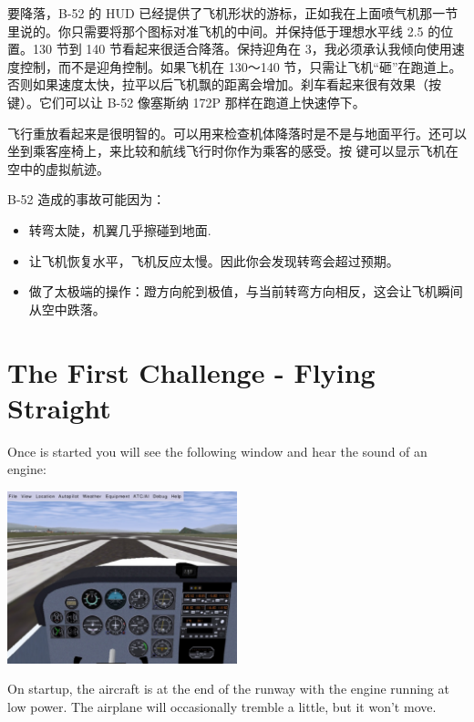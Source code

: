 \begin{itemize}
要降落，B-52 的 HUD 已经提供了飞机形状的游标，正如我在上面喷气机那一节里说的。你只需要将那个图标对准飞机的中间。并保持低于理想水平线 2.5\textdegree{} 的位置。130 节到 140 节看起来很适合降落。保持迎角在 3\textdegree{}，我必须承认我倾向使用速度控制，而不是迎角控制。如果飞机在 130～140 节，只需让飞机“砸”在跑道上。否则如果速度太快，拉平以后飞机飘的距离会增加。刹车看起来很有效果（按  键）。它们可以让 B-52 像塞斯纳 172P 那样在跑道上快速停下。

飞行重放看起来是很明智的。可以用来检查机体降落时是不是与地面平行。还可以坐到乘客座椅上，来比较和航线飞行时你作为乘客的感受。按  键可以显示飞机在空中的虚拟航迹。

B-52 造成的事故可能因为：
\begin{itemize}
    \item 转弯太陡，机翼几乎擦碰到地面.
    \item 让飞机恢复水平，飞机反应太慢。因此你会发现转弯会超过预期。
    \item 做了太极端的操作：蹬方向舵到极值，与当前转弯方向相反，这会让飞机瞬间从空中跌落。
\end{itemize}    


\iffalse
\section{The First Challenge - Flying Straight}
\label{sec:FlyingStraight}

Once \FlightGear{} is started you will see the following window and hear the
sound of an engine:

\begin{center}
\includegraphics[width=0.5\textwidth]{img/tut_6}
\end{center}

On startup, the aircraft is at the end of the runway with the engine running
at low power. The airplane will occasionally tremble a little, but it won't
move.


\end{itemize}
